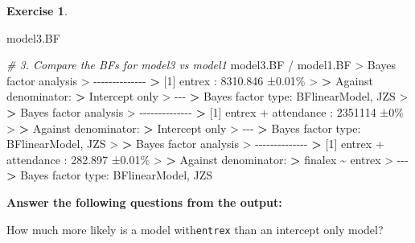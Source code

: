 \documentclass[
]{book}
\newenvironment{Shaded}{\begin{snugshade}}{\end{snugshade}}
\newcommand{\CommentTok}[1]{\textcolor[rgb]{0.56,0.35,0.01}{\textit{#1}}}
\newcommand{\DecValTok}[1]{\textcolor[rgb]{0.00,0.00,0.81}{#1}}
\newcommand{\ErrorTok}[1]{\textcolor[rgb]{0.64,0.00,0.00}{\textbf{#1}}}
\newcommand{\FloatTok}[1]{\textcolor[rgb]{0.00,0.00,0.81}{#1}}
\newcommand{\NormalTok}[1]{#1}
\newcommand{\SpecialCharTok}[1]{\textcolor[rgb]{0.00,0.00,0.00}{#1}}
\theoremstyle{definition}
\theoremstyle{definition}
\theoremstyle{definition}
\newtheorem{exercise}{Exercise}[chapter]
\theoremstyle{definition}
\theoremstyle{remark}
\begin{document}
\begin{exercise}
\begin{Shaded}
\begin{Highlighting}[]
\NormalTok{model3.BF}

\CommentTok{\# 3. Compare the BFs for model3 vs model1}
\NormalTok{model3.BF }\SpecialCharTok{/}\NormalTok{ model1.BF}
\SpecialCharTok{\textgreater{}}\NormalTok{ Bayes factor analysis}
\SpecialCharTok{\textgreater{}} \SpecialCharTok{{-}{-}{-}{-}{-}{-}{-}{-}{-}{-}{-}{-}{-}{-}}
\ErrorTok{\textgreater{}}\NormalTok{ [}\DecValTok{1}\NormalTok{] entrex }\SpecialCharTok{:} \FloatTok{8310.846}\NormalTok{ ±}\FloatTok{0.01}\NormalTok{\%}
\SpecialCharTok{\textgreater{}} 
\ErrorTok{\textgreater{}}\NormalTok{ Against denominator}\SpecialCharTok{:}
\ErrorTok{\textgreater{}}\NormalTok{   Intercept only }
\SpecialCharTok{\textgreater{}} \SpecialCharTok{{-}{-}{-}}
\ErrorTok{\textgreater{}}\NormalTok{ Bayes factor type}\SpecialCharTok{:}\NormalTok{ BFlinearModel, JZS}
\SpecialCharTok{\textgreater{}} 
\ErrorTok{\textgreater{}}\NormalTok{ Bayes factor analysis}
\SpecialCharTok{\textgreater{}} \SpecialCharTok{{-}{-}{-}{-}{-}{-}{-}{-}{-}{-}{-}{-}{-}{-}}
\ErrorTok{\textgreater{}}\NormalTok{ [}\DecValTok{1}\NormalTok{] entrex }\SpecialCharTok{+}\NormalTok{ attendance }\SpecialCharTok{:} \DecValTok{2351114}\NormalTok{ ±}\DecValTok{0}\NormalTok{\%}
\SpecialCharTok{\textgreater{}} 
\ErrorTok{\textgreater{}}\NormalTok{ Against denominator}\SpecialCharTok{:}
\ErrorTok{\textgreater{}}\NormalTok{   Intercept only }
\SpecialCharTok{\textgreater{}} \SpecialCharTok{{-}{-}{-}}
\ErrorTok{\textgreater{}}\NormalTok{ Bayes factor type}\SpecialCharTok{:}\NormalTok{ BFlinearModel, JZS}
\SpecialCharTok{\textgreater{}} 
\ErrorTok{\textgreater{}}\NormalTok{ Bayes factor analysis}
\SpecialCharTok{\textgreater{}} \SpecialCharTok{{-}{-}{-}{-}{-}{-}{-}{-}{-}{-}{-}{-}{-}{-}}
\ErrorTok{\textgreater{}}\NormalTok{ [}\DecValTok{1}\NormalTok{] entrex }\SpecialCharTok{+}\NormalTok{ attendance }\SpecialCharTok{:} \FloatTok{282.897}\NormalTok{ ±}\FloatTok{0.01}\NormalTok{\%}
\SpecialCharTok{\textgreater{}} 
\ErrorTok{\textgreater{}}\NormalTok{ Against denominator}\SpecialCharTok{:}
\ErrorTok{\textgreater{}}\NormalTok{   finalex }\SpecialCharTok{\textasciitilde{}}\NormalTok{ entrex }
\SpecialCharTok{\textgreater{}} \SpecialCharTok{{-}{-}{-}}
\ErrorTok{\textgreater{}}\NormalTok{ Bayes factor type}\SpecialCharTok{:}\NormalTok{ BFlinearModel, JZS}
\end{Highlighting}
\end{Shaded}

\hfill\break
\textbf{Answer the following questions from the output:}

How much more likely is a model with\texttt{entrex} than an intercept only model?


\end{exercise}
\end{document}
